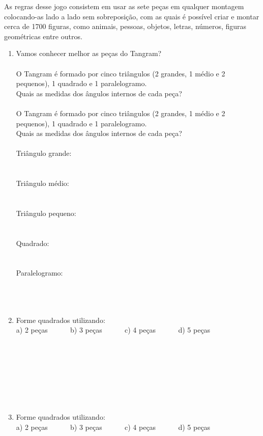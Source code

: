 \documentclass[a4paper, 14pt]{article}
\begin{document}
	\indent As regras desse jogo consistem em usar as sete peças em qualquer montagem colocando-as lado a lado sem sobreposição, com as quais é possível criar e montar cerca de 1700 figuras, como animais, pessoas, objetos, letras, números, figuras geométricas entre outros.
	\begin{enumerate}
		\item Vamos conhecer melhor as peças do Tangram? 
\\\\
		O Tangram é formado por cinco triângulos (2 grandes, 1 médio e 2 pequenos), 1 quadrado e 1 paralelogramo. \\
		Quais as medidas dos ângulos internos de cada peça? \\\\
		O Tangram é formado por cinco triângulos (2 grandes, 1 médio e 2 pequenos), 1 quadrado e 1 paralelogramo. \\
		Quais as medidas dos ângulos internos de cada peça? 
\\\\
		Triângulo grande:
\\\\\\
		Triângulo médio: 
\\\\\\
		Triângulo pequeno: 
\\\\\\
		Quadrado: 
\\\\\\
		Paralelogramo: 
\\\\\\
		\\
		\item Forme quadrados utilizando: 
\\
		a) 2 peças
~~~~~
		b) 3 peças
~~~~~
		c) 4 peças
~~~~~
		d) 5 peças
~~~~~
		\\\\\\\\\\\\\\\\
		\item Forme quadrados utilizando: 
\\
		a) 2 peças
~~~~~
		b) 3 peças
~~~~~
		c) 4 peças
~~~~~
		d) 5 peças
~~~~~
    \end{enumerate}
\end{document}
